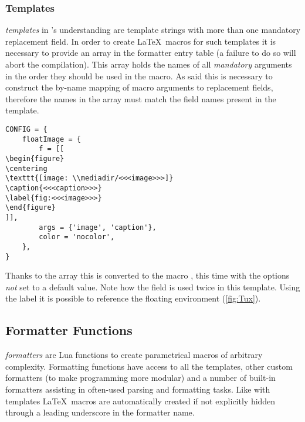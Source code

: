 \documentclass{scrartcl}
\begin{document}
\subsubsection{Templates}
\label{sec:templates-templates}

\emph{templates} in 's understanding are template strings
with more than one mandatory replacement field.  In order to create \LaTeX\
macros for such templates it is necessary to provide an  array in
the formatter entry table (a failure to do so will abort the compilation).  This
array holds the names of all \emph{mandatory} arguments in the order they should
be used in the macro.  As said this is necessary to construct the by-name
mapping of macro arguments to replacement fields, therefore the names in the
array must match the field names present in the template.

\begin{verbatim}
CONFIG = {
    floatImage = {
        f = [[
\begin{figure}
\centering
\texttt{[image: \\mediadir/<<<image>>>]}
\caption{<<<caption>>>}
\label{fig:<<<image>>>}
\end{figure}
]],
        args = {'image', 'caption'},
        color = 'nocolor',
    },
}
\end{verbatim}

\noindent Thanks to the  array this is converted to the macro
\luaMacroDocInline{floatImage}, this time with the options \emph{not} set to a
default value.  Note how the \luavar{<<<image>>>} field is used twice in this
template.  Using the label \luavar{fig:Tux} it is possible to reference the
floating environment (\vref{fig:Tux}).




\subsection{Formatter Functions}
\label{sec:formatter-functions}

\emph{formatters} are Lua functions to create parametrical macros of arbitrary
complexity.  Formatting functions have access to all the templates, other custom
formatters (to make programming more modular) and a number of built-in
formatters assisting in often-used parsing and formatting tasks.  Like with
templates \LaTeX\ macros are automatically created if not explicitly hidden
through a leading underscore in the formatter name.
\end{document}
